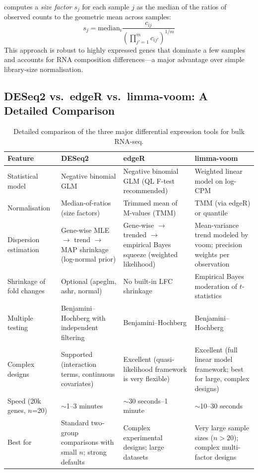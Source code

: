 \begin{keyconcept}[title={DESeq2 Median-of-Ratios Normalisation}]
 computes a \emph{size factor} $s_j$ for each sample $j$ as
the median of the ratios of observed counts to the geometric mean across
samples:
\begin{equation}
  \label{eq:rnaseq:sizefactor}
  s_j = \text{median}_i \frac{c_{ij}}{\left(\prod_{j'=1}^{m} c_{ij'}\right)^{1/m}}
\end{equation}
This approach is robust to highly expressed genes that dominate a few samples
and accounts for RNA composition differences---a major advantage over simple
library-size normalisation.
\end{keyconcept}

\subsection{DESeq2 vs.\ edgeR vs.\ limma-voom: A Detailed Comparison}
\label{subsec:rnaseq:detools_comparison}

\begin{table}[htbp]
\centering
\caption{Detailed comparison of the three major differential expression tools
for bulk RNA-seq.}
\label{tab:rnaseq:de_comparison}
\small
\begin{tabularx}{\textwidth}{lXXX}
\toprule
\textbf{Feature} & \textbf{DESeq2} & \textbf{edgeR} & \textbf{limma-voom} \\
\midrule
Statistical model & Negative binomial GLM & Negative binomial GLM (QL F-test recommended) & Weighted linear model on log-CPM \\
Normalisation & Median-of-ratios (size factors) & Trimmed mean of M-values (TMM) & TMM (via edgeR) or quantile \\
Dispersion estimation & Gene-wise MLE $\rightarrow$ trend $\rightarrow$ MAP shrinkage (log-normal prior) & Gene-wise $\rightarrow$ trended $\rightarrow$ empirical Bayes squeeze (weighted likelihood) & Mean-variance trend modeled by voom; precision weights per observation \\
Shrinkage of fold changes & Optional (apeglm, ashr, normal) & No built-in LFC shrinkage & Empirical Bayes moderation of $t$-statistics \\
Multiple testing & Benjamini--Hochberg with independent filtering & Benjamini--Hochberg & Benjamini--Hochberg \\
Complex designs & Supported (interaction terms, continuous covariates) & Excellent (quasi-likelihood framework is very flexible) & Excellent (full linear model framework; best for large, complex designs) \\
Speed (20k genes, $n$=20) & $\sim$1--3 minutes & $\sim$30 seconds--1 minute & $\sim$10--30 seconds \\
Best for & Standard two-group comparisons with small $n$; strong defaults & Complex experimental designs; large datasets & Very large sample sizes ($n > 20$); complex multi-factor designs \\
\bottomrule
\end{tabularx}
\end{table}

